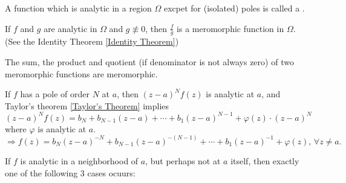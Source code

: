\begin{definition}
    A function which is analytic in a region $ \Omega $ excpet for (isolated) poles is called a .
\end{definition}
\begin{example}
    If  $ f $ and  $ g $ are analytic in  $ \Omega $ and  $ g\not\equiv 0 $, then  $ \frac{f}{g} $ is a meromorphic function in  $ \Omega $. (See the Identity Theorem \ref{Identity Theorem})
\end{example}
\begin{remark}
    The sum, the product and quotient (if denominator is not always zero) of two meromorphic functions are meromorphic.
\end{remark}
If  $ f $ has a pole of order  $ N $ at  $ a $, then  $ (z-a)^Nf(z) $ is analytic at  $ a $, and Taylor's theorem \ref{Taylor's Theorem} implies 
\begin{equation}
    (z-a)^Nf(z)=b_N+b_{N-1}(z-a)+\cdots+b_1(z-a)^{N-1}+\varphi(z)\cdot(z-a)^N
\end{equation}
where  $ \varphi $ is analytic at  $ a $.
\begin{equation}
    \Rightarrow  f(z)=b_N(z-a)^{-N}+b_{N-1}(z-a)^{-(N-1)}+\cdots+b_1(z-a)^{-1}+\varphi(z),\,\forall z\not= a . 
\end{equation} 
\begin{theorem}
    If  $ f $ is analytic in a neighborhood of  $ a $, but perhaps not at  $ a $ itself, then exactly one of the following  $ 3 $ cases ocuurs:
\end{theorem} 